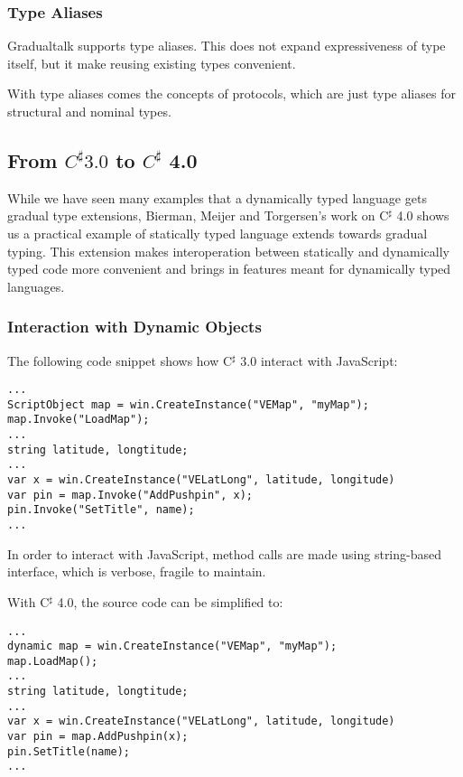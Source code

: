 \subsubsection{Type Aliases}

Gradualtalk supports type aliases. This does not expand expressiveness of type itself,
but it make reusing existing types convenient.

With type aliases comes the concepts of protocols, which are just type aliases
for structural and nominal types.

\newcommand{\csharp}{C^\sharp}
\subsection{From $\csharp 3.0$ to $\csharp$ 4.0}

While we have seen many examples that a dynamically typed language gets
gradual type extensions, Bierman, Meijer and Torgersen's work on
C$^\sharp$ 4.0 shows us a practical example of statically typed language
extends towards gradual typing.
This extension makes interoperation between statically and dynamically typed code
more convenient and brings in features meant for dynamically typed languages.

\subsubsection{Interaction with Dynamic Objects}

The following code snippet shows how C$^\sharp$ 3.0 interact with JavaScript:

\begin{verbatim}
...
ScriptObject map = win.CreateInstance("VEMap", "myMap");
map.Invoke("LoadMap");
...
string latitude, longtitude;
...
var x = win.CreateInstance("VELatLong", latitude, longitude)
var pin = map.Invoke("AddPushpin", x);
pin.Invoke("SetTitle", name);
...
\end{verbatim}

In order to interact with JavaScript, method calls
are made using string-based interface, which is verbose, fragile to maintain.

With C$^\sharp$ 4.0, the source code can be simplified to:

\begin{verbatim}
...
dynamic map = win.CreateInstance("VEMap", "myMap");
map.LoadMap();
...
string latitude, longtitude;
...
var x = win.CreateInstance("VELatLong", latitude, longitude)
var pin = map.AddPushpin(x);
pin.SetTitle(name);
...
\end{verbatim}

